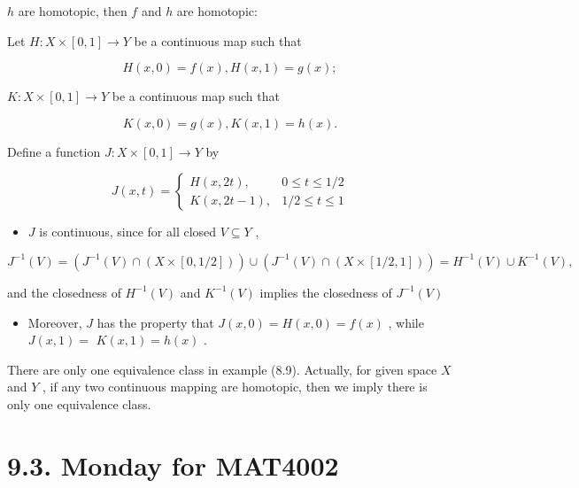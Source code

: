\(h\) are homotopic, then \(f\) and \(h\) are homotopic:

Let \(H : X \times  \left\lbrack  {0,1}\right\rbrack   \rightarrow  Y\) be a continuous map such that

\[
H\left( {x,0}\right)  = f\left( x\right) ,H\left( {x,1}\right)  = g\left( x\right) ;
\]

\(K : X \times  \left\lbrack  {0,1}\right\rbrack   \rightarrow  Y\) be a continuous map such that

\[
K\left( {x,0}\right)  = g\left( x\right) ,K\left( {x,1}\right)  = h\left( x\right) .
\]

Define a function \(J : X \times  \left\lbrack  {0,1}\right\rbrack   \rightarrow  Y\) by

\[
J\left( {x,t}\right)  = \left\{  \begin{matrix} H\left( {x,{2t}}\right) , & 0 \leq  t \leq  1/2 \\  K\left( {x,{2t} - 1}\right) , & 1/2 \leq  t \leq  1 \end{matrix}\right.
\]

\begin{itemize}
\item \(J\) is continuous, since for all closed \(V \subseteq  Y\) ,
\end{itemize}

\[
{J}^{-1}\left( V\right)  = \left( {{J}^{-1}\left( V\right)  \cap  \left( {X \times  \left\lbrack  {0,1/2}\right\rbrack  }\right) }\right)  \cup  \left( {{J}^{-1}\left( V\right)  \cap  \left( {X \times  \left\lbrack  {1/2,1}\right\rbrack  }\right) }\right)  = {H}^{-1}\left( V\right)  \cup  {K}^{-1}\left( V\right) ,
\]

and the closedness of \({H}^{-1}\left( V\right)\) and \({K}^{-1}\left( V\right)\) implies the closedness of \({J}^{-1}\left( V\right)\)

\begin{itemize}
\item Moreover, \(J\) has the property that \(J\left( {x,0}\right)  = H\left( {x,0}\right)  = f\left( x\right)\) , while \(J\left( {x,1}\right)  =\)  \(K\left( {x,1}\right)  = h\left( x\right)\) .
\end{itemize}

There are only one equivalence class in example (8.9). Actually, for given space \(X\) and \(Y\) , if any two continuous mapping are homotopic, then we imply there is only one equivalence class.

\section*{9.3. Monday for MAT4002}

